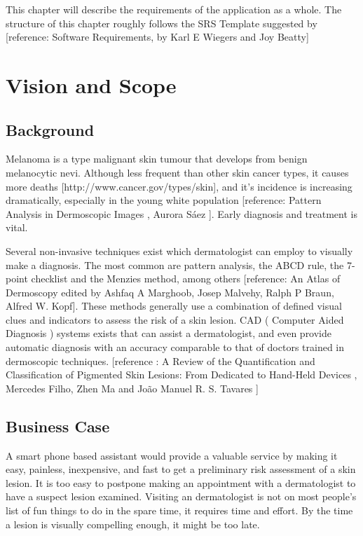 This chapter will describe the requirements of the application as a whole. The structure of this chapter roughly follows the SRS Template suggested by [reference: Software Requirements, by Karl E Wiegers and Joy Beatty]

\section{Vision and Scope}

    \subsection{Background}

        Melanoma is a type malignant skin tumour that develops from benign melanocytic nevi. Although less frequent than other skin cancer types, it causes more deaths [http://www.cancer.gov/types/skin], and it’s incidence is increasing dramatically, especially in the young white population [reference: Pattern Analysis in Dermoscopic Images , Aurora Sáez ]. Early diagnosis and treatment is vital.

Several non-invasive techniques exist which dermatologist can employ to visually make a diagnosis. The most common are pattern analysis, the ABCD rule, the 7-point checklist and the Menzies method, among others [reference: An Atlas of Dermoscopy edited by Ashfaq A Marghoob, Josep Malvehy, Ralph P Braun, Alfred W. Kopf]. These methods generally use a combination of defined visual clues and indicators to assess the risk of a skin lesion. CAD ( Computer Aided Diagnosis ) systems exists that can assist a dermatologist, and even provide automatic diagnosis with an accuracy comparable to that of doctors trained in dermoscopic techniques. [reference : A Review of the Quantification and Classification of Pigmented Skin Lesions: From Dedicated to Hand-Held Devices , Mercedes Filho, Zhen Ma and João Manuel R. S. Tavares ]

    \subsection{Business Case}

        A smart phone based assistant would provide a valuable service by making it easy, painless, inexpensive, and fast to get a preliminary risk assessment of a skin lesion. It is too easy to postpone making an appointment with a dermatologist to have a suspect lesion examined. Visiting an dermatologist is not on most people’s list of fun things to do in the spare time, it requires time and effort. By the time a lesion is visually compelling enough, it might be too late.

